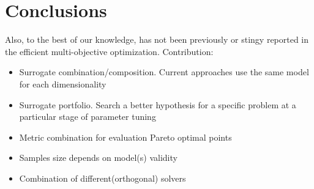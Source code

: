     \section{Conclusions}

        Also, to the best of our knowledge, has not been previously or stingy reported in the efficient multi-objective optimization.
        Contribution:
        \begin{itemize}
            \item Surrogate combination/composition. Current approaches use the same model for each dimensionality
            \item Surrogate portfolio. Search a better hypothesis  for a specific problem at a particular stage of parameter tuning
            \item Metric combination for evaluation Pareto optimal points
            \item Samples size depends on model(s) validity
            \item Combination of different(orthogonal) solvers
        \end{itemize}
